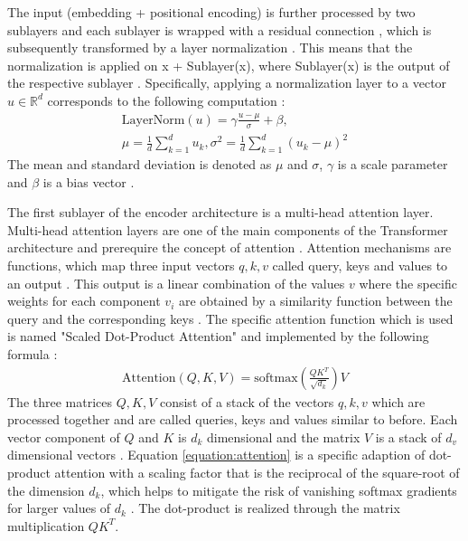 \par
The input (embedding + positional encoding) is further processed by two sublayers and each sublayer is wrapped with a residual connection \citep{He2016}, which is subsequently transformed by a layer normalization \citep{Ba2016}.
This means that the normalization is applied on x + Sublayer(x), where Sublayer(x) is the output of the respective sublayer \citep{Vaswani2017}.
Specifically, applying a normalization layer to a vector $u\in \mathbb{R}^d$ corresponds to the following computation \citep{Ba2016,Xiong2020}:
\begin{align}
	\text{LayerNorm}(u) = \gamma \frac{u-\mu}{\sigma}+\beta,\\
	\mu = \frac{1}{d}\sum_{k=1}^{d}u_k, \sigma^2 = \frac{1}{d}\sum_{k=1}^{d}(u_k - \mu)^2
\end{align}
The mean and standard deviation is denoted as $\mu$ and $\sigma$, $\gamma$ is a scale parameter and $\beta$ is a bias vector \citep{Xiong2020}.
\par
The first sublayer of the encoder architecture is a multi-head attention layer.   
Multi-head attention layers are one of the main components of the Transformer architecture and prerequire the concept of attention \citep{Vaswani2017}.
Attention mechanisms are functions, which map three input vectors $q,k,v$ called query, keys and values to an output \citep{Vaswani2017}.
This output is a linear combination of the values $v$ where the specific weights for each component $v_i$ are obtained by a similarity function between the query and the corresponding keys \citep{Vaswani2017}.
The specific attention function which is used is named "Scaled Dot-Product Attention" and implemented by the following formula \citep{Vaswani2017}:
\begin{align}
    \text{Attention}(Q,K,V) = \text{softmax}(\frac{QK^T}{\sqrt{d_k}})V
	\label{equation:attention}
\end{align}
The three matrices $Q,K,V$ consist of a stack of the vectors $q,k,v$ which are processed together and are called queries, keys and values similar to before.
Each vector component of $Q$ and $K$ is $d_k$ dimensional and the matrix $V$ is a stack of $d_v$ dimensional vectors \citep{Vaswani2017}.
Equation \ref{equation:attention} is a specific adaption of dot-product attention with a scaling factor that is the reciprocal of the square-root of the dimension $d_k$, which helps to mitigate the risk of vanishing softmax gradients for larger values of $d_k$ \citep{Vaswani2017}.
The dot-product is realized through the matrix multiplication $QK^T$.
